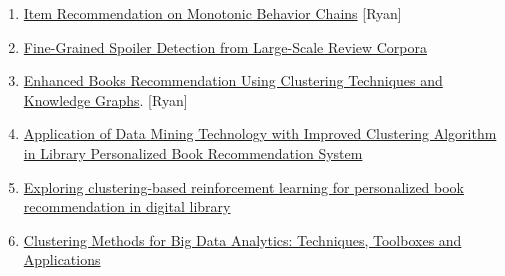 \begin{enumerate}[label=(\arabic*)]
    \item \cite{wan2018item} \href{https://mengtingwan.github.io/paper/recsys18_mwan.pdf}{Item Recommendation on Monotonic Behavior Chains} [Ryan] 
    \item \cite{wan2019fine} \href{https://mengtingwan.github.io/paper/acl19_mwan.pdf}{Fine-Grained Spoiler Detection from Large-Scale Review Corpora}
    \item \cite{valdiviezo2022enhanced} \href{https://link.springer.com/chapter/10.1007/978-3-031-24985-3_7}{Enhanced Books Recommendation Using Clustering Techniques and Knowledge Graphs}. [Ryan]
    \item \cite{lin2023application} \href{https://galileo-gatech.primo.exlibrisgroup.com/discovery/fulldisplay?vid=01GALI_GIT:GT&search_scope=CentralIndex&tab=Everything&docid=cdi_proquest_journals_2906873215&lang=en&context=PC}{Application of Data Mining Technology with Improved Clustering Algorithm in Library Personalized Book Recommendation System}
    \item \cite{wang2021exploring} \href{https://galileo-gatech.primo.exlibrisgroup.com/discovery/fulldisplay?vid=01GALI_GIT:GT&tab=Everything&docid=cdi_doaj_primary_oai_doaj_org_article_4ac92bb218cf469687cb00f7ad904f24&context=PC&search_scope=CentralIndex&lang=en}{Exploring clustering-based reinforcement learning for personalized book recommendation in digital library}
    \item \cite{nasraoui2019clustering} \href{https://galileo-gatech.primo.exlibrisgroup.com/discovery/fulldisplay?context=L&context=L&vid=01GALI_GIT:GT&vid=01GALI_GIT&docid=cdi_askewsholts_vlebooks_9783319978642&tab=default_tab&lang=en}{Clustering Methods for Big Data Analytics: Techniques, Toolboxes and Applications}

\end{enumerate}
